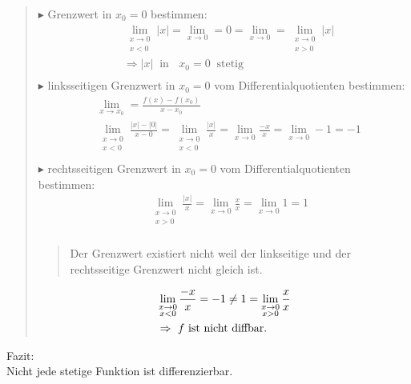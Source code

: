\begin{quote}
	$\blacktriangleright$ Grenzwert in $ x_0=0 $ bestimmen:\\
	\begin{align*}
	&\lim\limits_ {\substack{x \to 0 \\ x<0}}|x|=\lim\limits_ {x\to 0}=0=\lim\limits_ {x\to 0}=\lim\limits_ {\substack{x \to 0 \\ x>0}}|x|\\
	&\Rightarrow |x| \;\;\text{in }\;\;x_0=0\;\;\text{stetig }\\
	\end{align*}
	$\blacktriangleright$ linksseitigen Grenzwert in $ x_0=0 $ vom Differentialquotienten bestimmen:\\
	\begin{align*}
	&\lim\limits_ {x\to x_0}=\frac{f(x)-f(x_0)}{x-x_0}\\
	&\lim\limits_ {\substack{x \to 0 \\ x<0}}\frac{|x|-|0|}{x-0}=\lim\limits_ {\substack{x \to 0 \\ x<0}}\frac{|x|}{x}=\lim\limits_ {x\to 0}\frac{-x}{x}=\lim\limits_ {x\to 0}-1=-1\\
	\end{align*}
	$\blacktriangleright$ rechtsseitigen Grenzwert in $ x_0=0 $ vom Differentialquotienten bestimmen:\\
	\begin{align*}
	&\lim\limits_ {\substack{x \to 0 \\ x>0}}\frac{|x|}{x}=\lim\limits_ {x\to 0}\frac{x}{x}=\lim\limits_ {x\to 0}1=1\\
	\end{align*}
	\begin{quote}
		Der Grenzwert existiert nicht weil der linkseitige und der rechtsseitige Grenzwert nicht gleich ist. \\
	\end{quote}
	\begin{align*}
	&\lim\limits_ {\substack{x \to 0 \\ x<0}}\frac{-x}{x}=-1\neq1=\lim\limits_ {\substack{x \to 0 \\ x>0}}\frac{x}{x}\\
	&\Rightarrow\text{ $ f $ ist nicht diffbar. }\\
	\end{align*}
	
\end{quote}
Fazit:\\
Nicht jede stetige Funktion ist differenzierbar.
